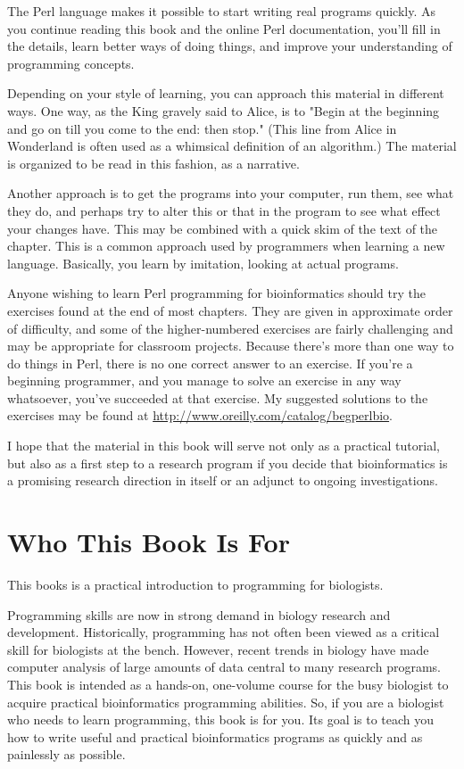The Perl language makes it possible to start writing real programs quickly. As you continue reading this book and the online Perl documentation, you'll fill in the details, learn better ways of doing things, and improve your understanding of programming concepts.

Depending on your style of learning, you can approach this material in different ways. One way, as the King gravely said to Alice, is to "Begin at the beginning and go on till you come to the end: then stop." (This line from Alice in Wonderland is often used as a whimsical definition of an algorithm.) The material is organized to be read in this fashion, as a narrative.

Another approach is to get the programs into your computer, run them, see what they do, and perhaps try to alter this or that in the program to see what effect your changes have. This may be combined with a quick skim of the text of the chapter. This is a common approach used by programmers when learning a new language. Basically, you learn by imitation, looking at actual programs.

Anyone wishing to learn Perl programming for bioinformatics should try the exercises found at the end of most chapters. They are given in approximate order of difficulty, and some of the higher-numbered exercises are fairly challenging and may be appropriate for classroom projects. Because there's more than one way to do things in Perl, there is no one correct answer to an exercise. If you're a beginning programmer, and you manage to solve an exercise in any way whatsoever, you've succeeded at that exercise. My suggested solutions to the exercises may be found at \href{http://www.oreilly.com/catalog/begperlbio}{http://www.oreilly.com/catalog/begperlbio}.

I hope that the material in this book will serve not only as a practical tutorial, but also as a first step to a research program if you decide that bioinformatics is a promising research direction in itself or an adjunct to ongoing investigations. 

\section*{Who This Book Is For}
This books is a practical introduction to programming for biologists.

Programming skills are now in strong demand in biology research and development. Historically, programming has not often been viewed as a critical skill for biologists at the bench. However, recent trends in biology have made computer analysis of large amounts of data central to many research programs. This book is intended as a hands-on, one-volume course for the busy biologist to acquire practical bioinformatics programming abilities. So, if you are a biologist who needs to learn programming, this book is for you. Its goal is to teach you how to write useful and practical bioinformatics programs as quickly and as painlessly as possible.

